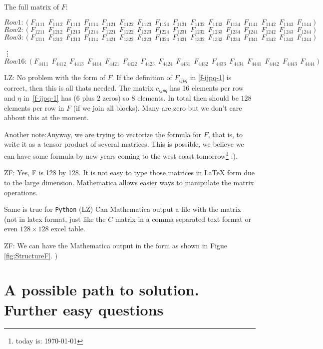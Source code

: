 \documentclass[12pt]{amsart}
\theoremstyle{definition}
\renewcommand{\labelenumi}{\textbf{\arabic{enumi}.}}
\renewcommand{\labelenumii}{\textbf{\arabic{enumi}\alph{enumii}.}}
\begin{document}
The full matrix of $F$:
\tiny{
 \[
Row 1: (F_{1111} \ \ F_{1112} \ \ F_{1113} \  \ F_{1114} \  \
F_{1121} \ \  F_{1122} \ \ F_{1123}  \ \ F_{1124}   \ \
F_{1131} \ \   F_{1132} \ \  F_{1133} \ \  F_{1134} \ \
F_{1141} \ \   F_{1142} \ \  F_{1143} \ \  F_{1144})
\]
\[
Row 2: (F_{1211} \ \ F_{1212} \ \ F_{1213} \  \ F_{1214} \  \
F_{1221} \ \  F_{1222} \ \ F_{1223}  \ \ F_{1224}   \ \
F_{1231} \ \   F_{1232} \ \  F_{1233} \ \  F_{1234} \ \
F_{1241} \ \   F_{1242} \ \  F_{1243} \ \  F_{1244})
\]
\[
Row 3: (F_{1311} \ \ F_{1312} \ \ F_{1313} \  \ F_{1314} \  \
F_{1321} \ \  F_{1322} \ \ F_{1323}  \ \ F_{1324}   \ \
F_{1331} \ \   F_{1332} \ \  F_{1333} \ \  F_{1334} \ \
F_{1341} \ \   F_{1342} \ \  F_{1343} \ \  F_{1344})
\]

\quad \vdots
\[
Row 16: (F_{4411} \ \ F_{4412} \ \ F_{4413} \  \ F_{4414} \  \
F_{4421} \ \  F_{4422} \ \ F_{4423}  \ \ F_{4424}   \ \
F_{4431} \ \   F_{4432} \ \  F_{4433} \ \  F_{4434} \ \
F_{4441} \ \   F_{4442} \ \  F_{4443} \ \  F_{4444})
\]
}
{\color{magenta}
LZ: No problem with the form of $F$. If the definition of $F_{ijpq}$ in \eqref{f-ijpq-1} is correct, then this is all thats needed. The matrix $c_{ijpq}$ has 16 elements per row and $\eta$ in~\eqref{f-ijpq-1} has ($6$ plus $2$ zeros) so $8$ elements. In total then should be $128$ elements per row in $F$ (if we join all blocks). Many are zero but we don't care abbout this at the moment. 

Another note:Anyway, we are trying to vectorize the formula for $F$, that is, to write it as a tensor product of several matrices. This is possible, we believe we can have some formula by new years coming to the west coast tomorrow\footnote{today is: \today} :). 

ZF: Yes, F is 128 by 128. It is not easy to type those matrices in LaTeX form due to the large dimension. Mathematica allows easier ways to manipulate the matrix operations.

Same is true for \verb|Python| (LZ) Can Mathematica output a file with the matrix (not in latex format, just like the $C$ matrix in a comma separated text format or even $128\times 128$ excel table.

ZF: We can have the Mathematica output in the form as shown in Figue \ref{fig:StructureF}.
)
} %
\section{A possible path to solution. Further easy questions\label{s:path}}
\renewcommand{\labelenumi}{\textbf{\arabic{enumi}.}}
\renewcommand{\labelenumii}{\textbf{\alph{enumii}.}}
\end{document}
